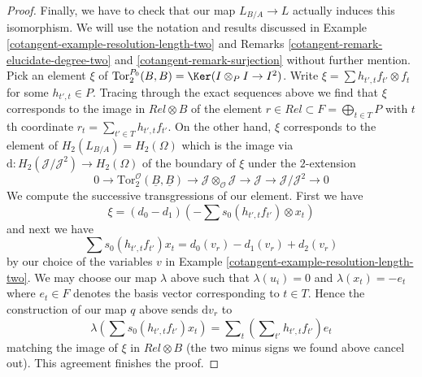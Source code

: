 \begin{proof}
\medskip\noindent
Finally, we have to check that our map $L_{B/A} \to L$ actually induces
this isomorphism. We will use the notation and results discussed in
Example \ref{cotangent-example-resolution-length-two} and
Remarks \ref{cotangent-remark-elucidate-degree-two} and \ref{cotangent-remark-surjection}
without further mention. Pick an element $\xi$ of
$\text{Tor}_2^{P_0}(B, B) = \Ker(I \otimes_P I \to I^2)$.
Write $\xi = \sum h_{t', t}f_{t'} \otimes f_t$ for some
$h_{t', t} \in P$. Tracing through the exact sequences above we
find that $\xi$ corresponds to the image in $Rel \otimes B$
of the element $r \in Rel \subset F = \bigoplus_{t \in T} P$ with
$t$th coordinate $r_t = \sum_{t' \in T} h_{t', t}f_{t'}$.
On the other hand, $\xi$ corresponds to the element of
$H_2(L_{B/A}) = H_2(\Omega)$ which is the image
via $\text{d} : H_2(\mathcal{J}/\mathcal{J}^2) \to H_2(\Omega)$
of the boundary of $\xi$ under the $2$-extension
$$
0 \to
\text{Tor}_2^\mathcal{O}(\underline{B}, \underline{B})
\to
\mathcal{J} \otimes_\mathcal{O} \mathcal{J} \to \mathcal{J}
\to
\mathcal{J}/\mathcal{J}^2 \to 0
$$
We compute the successive transgressions of our element. First we have
$$
\xi = (d_0 - d_1)(- \sum s_0(h_{t', t} f_{t'}) \otimes x_t)
$$
and next we have
$$
\sum s_0(h_{t', t} f_{t'}) x_t = d_0(v_r) - d_1(v_r) + d_2(v_r)
$$
by our choice of the variables $v$ in
Example \ref{cotangent-example-resolution-length-two}.
We may choose our map $\lambda$ above such that
$\lambda(u_i) = 0$ and $\lambda(x_t) = - e_t$ where $e_t \in F$
denotes the basis vector corresponding to $t \in T$.
Hence the construction of our map $q$ above sends $\text{d}v_r$ to
$$
\lambda(\sum s_0(h_{t', t} f_{t'}) x_t) =
\sum\nolimits_t \left(\sum\nolimits_{t'} h_{t', t}f_{t'}\right) e_t
$$
matching the image of $\xi$ in $Rel \otimes B$ (the two minus signs
we found above cancel out). This agreement finishes the proof.
\end{proof}

